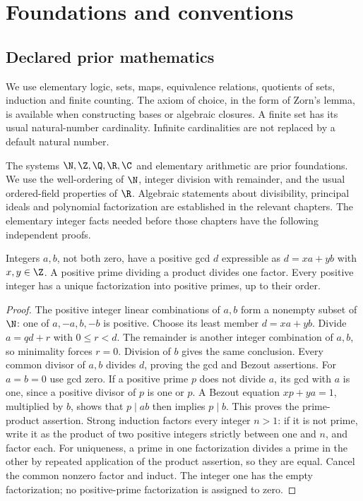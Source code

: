 \chapter{Foundations and conventions}
\label{chap:foundations}
\section{Declared prior mathematics}
We use elementary logic, sets, maps, equivalence relations, quotients of sets,
induction and finite counting. The axiom of choice, in the form of Zorn's
lemma, is available when constructing bases or algebraic closures. A finite
set has its usual natural-number cardinality. Infinite cardinalities are
not replaced by a default natural number.

The systems $\N,\Z,\Q,\R,\C$ and elementary arithmetic are prior
foundations. We use the well-ordering of $\N$, integer division with
remainder, and the usual ordered-field properties of $\R$. Algebraic
statements about divisibility, principal ideals and polynomial factorization
are established in the relevant chapters. The elementary integer facts
needed before those chapters have the following independent proofs.

\begin{theorem}\label{thm:integer-arithmetic}
Integers $a,b$, not both zero, have a positive gcd $d$ expressible as
$d=xa+yb$ with $x,y\in\Z$. A positive prime dividing a product
divides one factor. Every positive integer has a unique factorization
into positive primes, up to their order.
\end{theorem}
\begin{proof}
The positive integer linear combinations of $a,b$ form a nonempty
subset of $\N$: one of $a,-a,b,-b$ is positive. Choose its least
member $d=xa+yb$. Divide $a=qd+r$ with $0\le r<d$. The remainder
is another integer combination of $a,b$, so minimality forces $r=0$.
Division of $b$ gives the same conclusion. Every common divisor of
$a,b$ divides $d$, proving the gcd and Bezout assertions. For $a=b=0$
use gcd zero. If a positive prime $p$ does not divide $a$, its gcd
with $a$ is one, since a positive divisor of $p$ is one or $p$.
A Bezout equation $xp+ya=1$, multiplied by $b$, shows that
$p\mid ab$ then implies $p\mid b$. This proves the prime-product
assertion. Strong induction factors every integer $n>1$: if it is
not prime, write it as the product of two positive integers strictly
between one and $n$, and factor each. For uniqueness, a prime in one
factorization divides a prime in the other by repeated application
of the product assertion, so they are equal. Cancel the common
nonzero factor and induct. The integer one has the empty
factorization; no positive-prime factorization is assigned to zero.
\end{proof}

